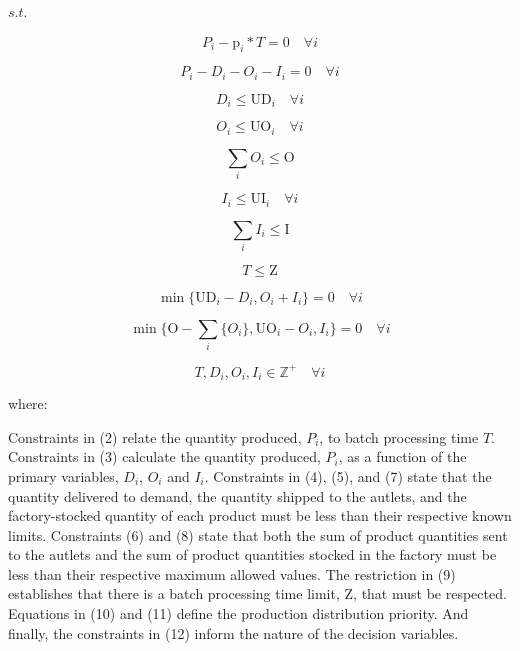\documentclass[authoryear,manuscript,12pt]{elsarticle}
\begin{document}
$s.t.$

\begin{equation}
P_i - \textrm{p}_i * T  = 0 \quad \forall i
\end{equation}

\begin{equation}
P_i - D_i - O_i - I_i = 0 \quad \forall i
\end{equation}

\begin{equation}
\label{MBPTMP04}
D_i \leq \textrm{UD}_i \quad \forall i
\end{equation}

\begin{equation}
O_i \leq \textrm{UO}_i \quad \forall i
\end{equation}

\begin{equation}
\sum_i{O_i} \leq \textrm{O}
\end{equation}

\begin{equation}
I_i \leq \textrm{UI}_i \quad \forall i
\end{equation}

\begin{equation}
\sum_i{I_i} \leq \textrm{I}
\end{equation}

\begin{equation}
T \leq \textrm{Z}
\end{equation}

\begin{equation}
\min \{\textrm{UD}_i - D_i, O_i + I_i\} = 0 \quad \forall i
\end{equation}

\begin{equation}
\min\{\textrm{O} - \sum_i\{ O_i\}, \textrm{UO}_i - O_i, I_i\} = 0 \quad \forall i
\end{equation}

\begin{equation}
\label{MBPTMP10}
T, D_i, O_i, I_i \in  \mathbb{Z}^+ \quad \forall i
\end{equation}

where:

Constraints in (2) relate the quantity produced, $P_i$, to batch processing time $T$. Constraints in (3) calculate the quantity produced, $P_i$, as a function of the primary variables, $D_i$, $O_i$ and $I_i$. Constraints in (4), (5), and (7) state that the quantity delivered to demand, the quantity shipped to the autlets, and the factory-stocked quantity of each product must be less than their respective known limits. Constraints (6) and (8) state that both the sum of product quantities sent to the autlets and the sum of product quantities stocked in the factory must be less than their respective maximum allowed values. The restriction in (9) establishes that there is a batch processing time limit, $\textrm{Z}$, that must be respected. Equations in (10) and (11) define the production distribution priority. And finally, the constraints in (12) inform the nature of the decision variables.
\end{document}
